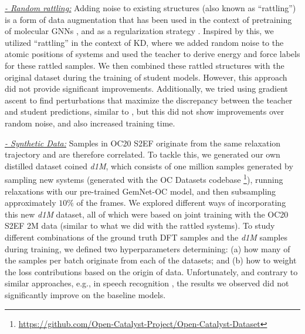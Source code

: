 \documentclass{article}
\begin{document}
\underline{\emph{- Random rattling:}}
Adding noise to existing structures (also known as ``rattling'') is a form of data augmentation that has been used in the context of pretraining of molecular GNNs \cite{zaidi2022pre, magar_crystal_2022}, and as a regularization strategy \cite{godwin2021simple}. Inspired by this, we utilized ``rattling'' in the context of KD, where we added random noise to the atomic positions of systems and used the teacher to derive energy and force labels for these rattled samples. We then combined these rattled structures with the original dataset during the training of student models. However, this approach did not provide significant improvements. Additionally, we tried using gradient ascent to find perturbations that maximize the discrepancy between the teacher and student predictions, similar to \cite{schwalbe-koda_differentiable_2021}, but this did not show improvements over random noise, and also increased training time. 

\underline{\emph{- Synthetic Data:}}
Samples in OC20 S2EF originate from the same relaxation trajectory and are therefore correlated. To tackle this, we generated our own distilled dataset coined \textit{d1M}, which consists of one million samples generated by sampling new systems (generated with the OC Datasets codebase \footnote{\url{https://github.com/Open-Catalyst-Project/Open-Catalyst-Dataset}}), running relaxations with our pre-trained GemNet-OC model, and then subsampling approximately $10\%$ of the frames.
We explored different ways of incorporating this new \emph{d1M} dataset, all of which were based on joint training with the OC20 S2EF 2M data (similar to what we did with the rattled systems). 
%
To study different combinations of the ground truth DFT samples and the \emph{d1M} samples during training, we defined two hyperparameters determining: (a) how many of the samples per batch originate from each of the datasets; and (b) how to weight the loss contributions based on the origin of data. Unfortunately, and contrary to similar approaches, e.g., in speech recognition \cite{zhang2020pushing}, the results we observed did not significantly improve on the baseline models. 
\end{document}
